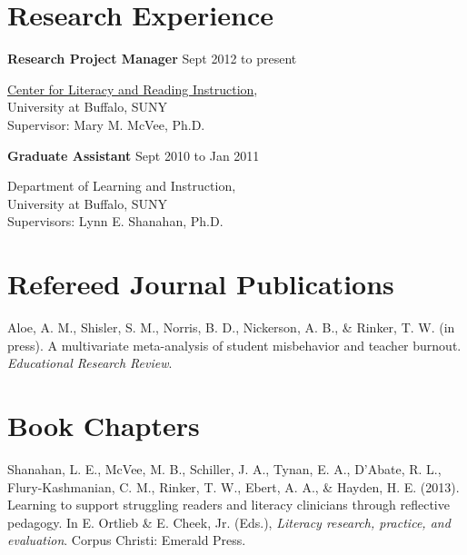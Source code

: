 \section{Research Experience}

\textbf{Research Project Manager} \hfill {Sept 2012 to present}
\begin{innerlist}

\item[] \href{http://clari.buffalo.edu}{Center for Literacy and Reading Instruction},\\
        University at Buffalo, SUNY\\
        Supervisor: Mary M. McVee, Ph.D.
\end{innerlist}

\textbf{Graduate Assistant} \hfill {Sept 2010 to Jan 2011}
\begin{innerlist}

\item[] Department of Learning and Instruction,\\
        University at Buffalo, SUNY\\
        Supervisors: Lynn E. Shanahan, Ph.D.
\end{innerlist}

\section{Refereed Journal Publications}
\vspace{-.1275in}
\begin{bibsection}
    \item Aloe, A. M., Shisler, S. M., Norris, B. D., Nickerson, A. B., \& Rinker, T. W. (in press). A multivariate meta-analysis of student misbehavior and teacher burnout. \emph{Educational Research Review}. 
\end{bibsection}
\halfblankline

\section{Book Chapters}
\vspace{-.1275in}
\begin{bibsection}
    \item Shanahan, L. E., McVee, M. B., Schiller, J. A., Tynan, E. A., D'Abate, R. L., Flury-Kashmanian, C. M., Rinker, T. W., Ebert, A. A., \& Hayden, H. E. (2013). Learning to support struggling readers and literacy clinicians through reflective pedagogy. In E. Ortlieb \& E. Cheek, Jr. (Eds.), \emph{Literacy research, practice, and evaluation}. Corpus Christi: Emerald Press.
\end{bibsection}

